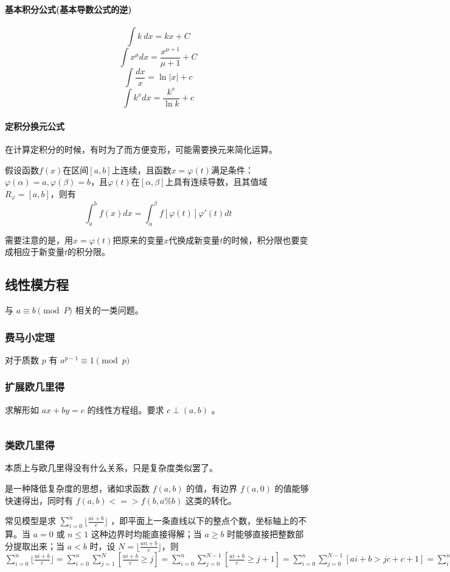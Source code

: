 \documentclass[UTF-8]{ctexart}
\newcommand{\cpp}[1]{\inputminted[bgcolor=bg,breaklines,breakanywhere=true]{c++}{#1}}
\begin{document}
			\paragraph{基本积分公式(基本导数公式的逆)}
			$$\int k\ dx=kx+C$$
			$$\int x^\mu dx=\frac{x^{\mu+1}}{\mu+1}+C$$
			$$\int \frac{dx}{x}=\ln |x|+c$$
			$$\int k^x dx=\frac{k^x}{\ln k}+c$$
			\paragraph{定积分换元公式}	在计算定积分的时候，有时为了而方便变形，可能需要换元来简化运算。  
	
			假设函数$f(x)$在区间$[a,b]$上连续，且函数$x=\varphi(t)$满足条件：$\varphi(\alpha)=a,\varphi(\beta)=b$，且$\varphi(t)$在$[\alpha,\beta]$上具有连续导数，且其值域$R_\varphi=[a,b]$，则有  
	$$\int _ a^b f(x)dx=\int _ {\alpha}^{\beta} f[\varphi(t)]\varphi'(t)dt$$  
	
			需要注意的是，用$x=\varphi(t)$把原来的变量$x$代换成新变量$t$的时候，积分限也要变成相应于新变量$t$的积分限。
		\subsection{线性模方程}
		与 $a \equiv b \pmod P$ 相关的一类问题。
			\subsubsection{费马小定理}
			对于质数 $p$ 有 $a^{p-1} \equiv 1 \pmod p$
			\subsubsection{扩展欧几里得}
			求解形如 $ax+by=c$ 的线性方程组。要求 $c \perp (a,b)$ 。
			
			\cpp{code//Math//exgcd.cpp}
			\subsubsection{类欧几里得}
			本质上与欧几里得没有什么关系，只是复杂度类似罢了。

			是一种降低复杂度的思想，诸如求函数 $f(a,b)$ 的值，有边界 $f(a,0)$ 的值能够快速得出，同时有 $f(a,b) <=> f(b,a\%b)$ 这类的转化。
	
			常见模型是求 $\sum_{i=0}^{n}\lfloor \frac{ai+b}{c} \rfloor$ ，即平面上一条直线以下的整点个数，坐标轴上的不算。当 $a=0$ 或 $n \le 1$ 这种边界时均能直接得解；当 $a \ge b$ 时能够直接把整数部分提取出来；当 $a < b$ 时，设 $N=\lfloor \frac{an+b}{c} \rfloor $，则 $\sum_{i=0}^{n}\lfloor \frac{ai+b}{c} \rfloor=\sum_{i=0}^{n} \sum_{j=1}^N [\frac{ai+b}{c} \ge j]=\sum_{i=0}^n \sum_{j=0}^{N-1} [\frac{ai+b}{c} \ge j+1]=\sum_{i=0}^n \sum_{j=0}^{N-1} [ai+b>jc+c+1]=\sum_{i=0}^n \sum_{j=0}^{N-1} [i>\frac{jc+c+1-b}{a}]=\sum_{j=0}^{N-1} n-\lfloor \frac{jc+c+1-b}{a} \rfloor=n(N-1)-\sum_{i=0}^{N-1} \lfloor \frac{ic+(c+1-b)}{a} \rfloor $
			
\end{document}
